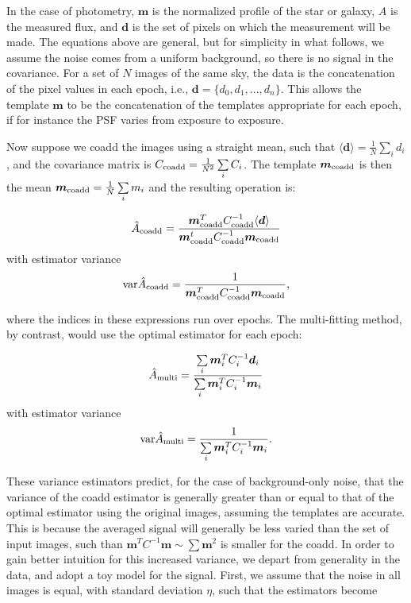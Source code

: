 \documentclass[fleqn,useAMS,usenatbib]{mnras}
\newcommand{\coadd}{{\rm coadd}}
\begin{document}
In the case of photometry, $\boldsymbol{m}$ is the normalized profile of the
star or galaxy, $A$ is the measured flux, and $\boldsymbol{d}$ is the set of
pixels on which the measurement will be made.  The equations above are general,
but for simplicity in what follows, we assume the noise comes from a uniform
background, so there is no signal in the covariance.
For a set of $N$ images of the same sky, the data is the concatenation of the
pixel values in each epoch, i.e., $\boldsymbol{d} = \{d_0, d_1, ..., d_n \}$.
This allows the template $\boldsymbol{m}$ to be the concatenation of the
templates appropriate for each epoch, if for instance the PSF varies from
exposure to exposure.

Now suppose we coadd the images using a straight mean, such that $\langle
\boldsymbol{d} \rangle = \frac{1}{N}\sum\limits_i d_i$, and the covariance
matrix is $C_\coadd = \frac{1}{N^2}\sum\limits_i C_i$.  The template
$\boldsymbol{m}_\coadd$ is then the mean $\boldsymbol{m}_\coadd = 
\frac{1}{N}\sum\limits_i m_i$
and the resulting operation is:

\begin{align}
\hat{A}_\coadd = \frac{\boldsymbol{m}_\coadd^T C_\coadd^{-1} \langle 
\boldsymbol{d} \rangle}{\boldsymbol{m}_\coadd^t 
C_\coadd^{-1}\boldsymbol{m}_\coadd} 
\end{align}
with estimator variance
\begin{align} \label{eq:exact_var_coadd}
{\rm var}\hat{A}_\coadd = \frac{1}{\boldsymbol{m}_\coadd^T 
C_\coadd^{-1}\boldsymbol{m}_\coadd},
\end{align}

where the indices in these expressions run over epochs. The multi-fitting
method, by contrast, would use the optimal estimator for each epoch:

\begin{align}
\hat{A}_{\rm multi} = \frac{\sum\limits_i \boldsymbol{m}_i^T 
C_i^{-1}\boldsymbol{d}_i}{\sum\limits_i \boldsymbol{m}_i^T 
C_i^{-1}\boldsymbol{m}_i}
\end{align}
with estimator variance
\begin{align}
\label{eq:exact_var_multi}
{\rm var}\hat{A}_{\rm multi} = \frac{1}{\sum\limits_i \boldsymbol{m}_i^T 
C_i^{-1}\boldsymbol{m}_i}.
\end{align}

These variance estimators predict, for the case of background-only noise, that 
the variance of the coadd estimator is generally greater than or equal to that of
the optimal estimator using the original images, assuming the templates are
accurate.  This is because the averaged signal will generally be less varied
than the set of input images, such than $\boldsymbol{m}^T C^{-1} \boldsymbol{m}
\sim \sum \boldsymbol{m}^2$ is smaller for the coadd.
In order to gain better intuition for this increased variance, we depart from
generality in the data, and adopt a toy model for the signal.  First, we assume
that the noise in all images is equal, with standard deviation $\eta$, such
that the estimators become
\end{document}
